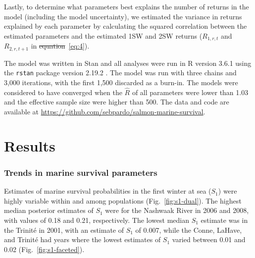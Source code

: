 \documentclass[12pt]{article}
\newcommand{\So}{$S_{1}$\xspace}
\providecommand{\DIFaddtex}[1]{{\protect\color{blue}\uwave{#1}}} %
\providecommand{\DIFdeltex}[1]{{\protect\color{red}\sout{#1}}}                      %
\providecommand{\DIFaddbegin}{} %
\providecommand{\DIFaddend}{} %
\providecommand{\DIFdelbegin}{} %
\providecommand{\DIFdelend}{} %
\providecommand{\DIFadd}[1]{\texorpdfstring{\DIFaddtex{#1}}{#1}} %
\providecommand{\DIFdel}[1]{\texorpdfstring{\DIFdeltex{#1}}{}} %
\begin{document}
Lastly, to determine what parameters best explains the number of returns in
the model (including the model uncertainty), we estimated the variance in returns explained by each parameter by
calculating the squared correlation between the estimated parameters and the
estimated 1SW and 2SW returns ($R_{1,r,t}$ and $R_{2,r,t+1}$ in
\DIFdelbegin \DIFdel{equation}\DIFdelend \DIFaddbegin \DIFadd{equations~\ref{eq:3} and}\DIFaddend ~\ref{eq:4}).

The model was written in Stan \citep{Carpenter2017} and all analyses were run in R version 3.6.1
\citep{RCoreTeam2019} using the \texttt{rstan} package version 2.19.2
\citep{StanDevelopmentTeam2019}.
The model was run with three chains and 3,000 iterations, with the first 1,500
discarded as a burn-in. The models were considered to have converged when the
$\hat R$ of all parameters were lower than 1.03 and the effective sample size
were higher than 500. The data and code are available at \url{https://github.com/sebpardo/salmon-marine-survival}.



\section*{Results}


\subsubsection*{Trends in marine survival parameters}

Estimates of marine survival probabilities in the first winter at sea (\So) were
highly variable within and among populations
(Fig.~\ref{fig:s1-dual}). The highest median posterior estimates of \So
were for the Nashwaak River in 2006 and 2008, with values of 0.18 and 0.21,
respectively. The lowest median \So estimate was in the Trinit\'{e} in 2001,
with an estimate of \So of 0.007, while the Conne, LaHave, and Trinit\'{e} had
years where the lowest estimates of \So varied between 0.01 and 0.02 (Fig.~\ref{fig:s1-faceted}).
\end{document}
